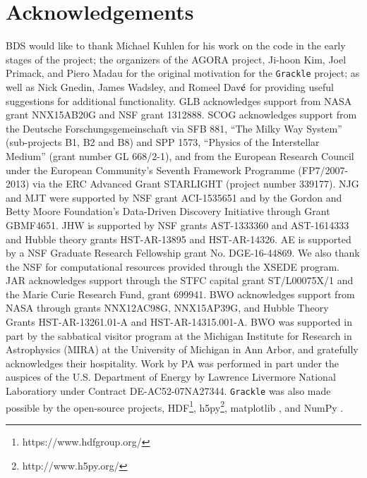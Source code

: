 \section*{Acknowledgements}

BDS would like to thank Michael Kuhlen for his work on the code in the
early stages of the project; the organizers of the AGORA project,
Ji-hoon Kim, Joel Primack, and Piero Madau for the original motivation
for the \texttt{Grackle} project; as well as Nick Gnedin, James
Wadsley, and Romeel Dav$\acute{\rm e}$ for providing useful
suggestions for additional functionality.  GLB acknowledges support
from NASA grant NNX15AB20G and NSF grant 1312888. SCOG acknowledges
support from the Deutsche Forschungsgemeinschaft via SFB 881, ``The
Milky Way System'' (sub-projects B1, B2 and B8) and SPP 1573,
``Physics of the Interstellar Medium'' (grant number GL 668/2-1), and
from the European Research Council under the European Community's
Seventh Framework Programme (FP7/2007-2013) via the ERC Advanced Grant
STARLIGHT (project number 339177).  NJG and MJT were supported by NSF
grant ACI-1535651 and by the Gordon and Betty Moore Foundation's
Data-Driven Discovery Initiative through Grant GBMF4651.  JHW is
supported by NSF grants AST-1333360 and AST-1614333 and Hubble theory
grants HST-AR-13895 and HST-AR-14326.  AE is supported by a NSF
Graduate Research Fellowship grant No. DGE-16-44869. We also thank the
NSF for computational resources provided through the XSEDE
program. JAR acknowledges support through the STFC capital grant
ST/L00075X/1 and the Marie Curie Research Fund, grant 699941.
BWO acknowledges support from  NASA through grants
NNX12AC98G, NNX15AP39G, and Hubble Theory Grants HST-AR-13261.01-A and
HST-AR-14315.001-A.  BWO was supported in part by the sabbatical
visitor program at the Michigan Institute for Research in Astrophysics
(MIRA) at the University of Michigan in Ann Arbor, and gratefully
acknowledges their hospitality.
Work by PA was performed in part under the auspices of
the U.S. Department of Energy by Lawrence Livermore National
Laboratiory under Contract DE-AC52-07NA27344.  \texttt{Grackle} was
also made possible by the open-source projects,
HDF\footnote{https://www.hdfgroup.org/},
h5py\footnote{http://www.h5py.org/}, matplotlib
\citep{2005ASPC..347...91B}, and NumPy \citep{numpy}.

